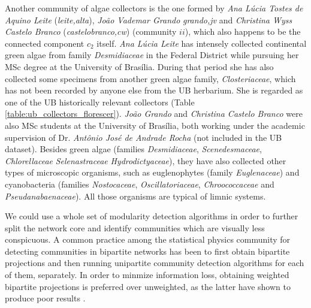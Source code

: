 Another community of algae collectors is the one formed by \textit{Ana Lúcia Tostes de Aquino Leite} (\textit{leite,alta}), \textit{João Vademar Grando} \textit{grando,jv} and \textit{Christina Wyss Castelo Branco} (\textit{castelobranco,cw}) (community $ii$), which also happens to be the connected component $c_2$ itself.
\textit{Ana Lúcia Leite} has intensely collected continental green algae from family \textit{Desmidiaceae} in the Federal District while pursuing her MSc degree at the University of Brasília.
During that period she has also collected some specimens from another green algae family, \textit{Closteriaceae}, which has not been recorded by anyone else from the UB herbarium.
She is regarded as one of the UB historically relevant collectors (Table \ref{table:ub_collectors_florescer}).
%
\textit{João Grando} and \textit{Christina Castelo Branco} were also MSc students at the University of Brasília, both working under the academic supervision of Dr. \textit{Antônio José de Andrade Rocha} (not included in the UB dataset).
Besides green algae (families \textit{Desmidiaceae}, \textit{Scenedesmaceae}, \textit{Chlorellaceae} \textit{Selenastraceae} \textit{Hydrodictyaceae}), they have also collected other types of microscopic organisms, such as euglenophytes (family \textit{Euglenaceae}) and cyanobacteria (families \textit{Nostocaceae}, \textit{Oscillatoriaceae}, \textit{Chroococcaceae} and \textit{Pseudanabaenaceae}). 
All those organisms are typical of limnic systems.
 

We could use a whole set of modularity detection algorithms in order to further split the network core and identify communities which are visually less conspicuous. 
A common practice among the statistical physics community for detecting communities in bipartite networks has been to first obtain bipartite projections and then running unipartite community detection algorithms for each of them, separately.
In order to minmize information loss, obtaining weighted bipartite projections is preferred over unweighted, as the latter have shown to produce poor results \cite{Guimera2007}.



